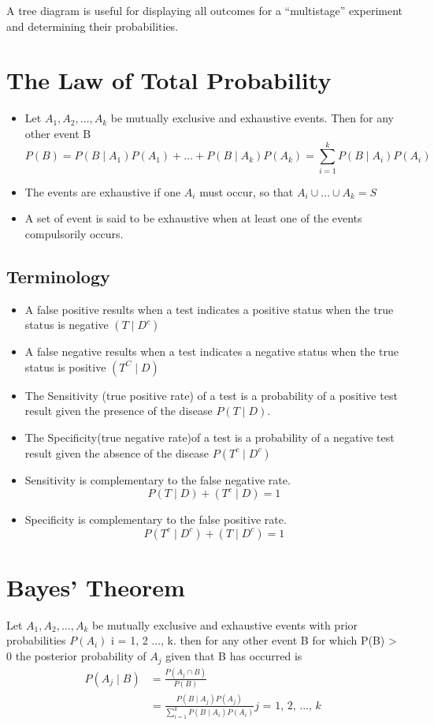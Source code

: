 \documentclass{article}
\newenvironment{exblock}[1]{%
    \tcolorbox[beamer,%
    noparskip,breakable,
    colback=lightgreen,colframe=darkgreen,%
    colbacklower=limegreen!75!lightgreen,%
    title=#1]}%
    {\endtcolorbox}
\begin{document}
A tree diagram is useful for displaying all outcomes for a “multistage” experiment and determining their probabilities.

\section{The Law of Total Probability}
\begin{itemize}
\item Let \(A_1, A_2, \ldots, A_k\) be mutually exclusive and exhaustive events. Then for any other event B 
$$ P(B) = P(B\mid A_1) P(A_1) + \ldots + P(B\mid A_k) P(A_k) = \sum_{i=1}^{k} P(B\mid A_i)P(A_i)$$
\item The events are exhaustive if one \(A_i\) must occur, so that \(A_i \cup \ldots \cup A_k = S\)
\item A set of event is said to be exhaustive when at least one of the events compulsorily occurs.
\end{itemize}

\subsection{Terminology}
\begin{itemize}
\item A false positive results when a test indicates a positive status when the true status is negative \((T\mid D^c)\)
\item A false negative results when a test indicates a negative status when the true status is positive \((T^C \mid D)\)
\item The Sensitivity (true positive rate) of a test is a probability of a positive test result given the presence of the disease \(P(T\mid D)\).
\item The Specificity(true negative rate)of a test is a probability of a negative test result given the absence of the
disease \(P(T^c \mid  D^c)\)
\end{itemize}

\begin{exblock}{Note}
\begin{itemize}
\item Sensitivity is complementary to the false negative rate.
$$ P(T \mid D) + (T^c \mid D) = 1 $$
\item Specificity is complementary to the false positive rate.
$$ P(T^c \mid D^c) + (T \mid D^c) = 1 $$
\end{itemize}
\end{exblock}

\section{Bayes' Theorem}

Let \(A_1, A_2, \ldots, A_k\) be mutually exclusive and exhaustive events with prior probabilities \(P(A_i)\) i = 1, 2 ..., k. then for any other event B for which P(B) > 0 the posterior probability of \(A_j\) given that B has occurred is 
$$ \begin{aligned} P(A_j \mid B) & = \frac{P(A_j \cap B)}{P(B)}\\ & = \frac{P(B \mid A_j) P(A_j)}{\sum_{i=1}^{k} P(B\mid A_i) P(A_i)}\textit{j = 1, 2, ..., k }\end{aligned}$$
\end{document}
